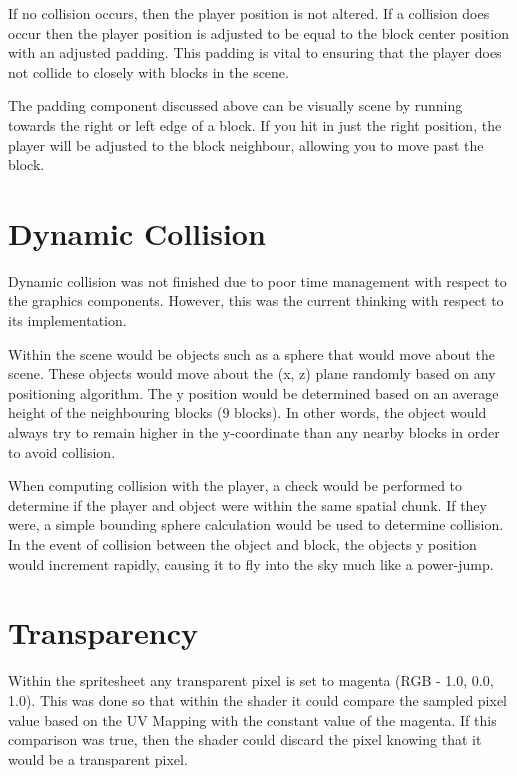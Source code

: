 \documentclass{book}
\begin{document}
If no collision occurs, then the player position is not altered.  If a collision does occur then the player position is adjusted to be equal to the block center position with an adjusted padding.  This padding is vital to ensuring that the player does not collide to closely with blocks in the scene.
    
The padding component discussed above can be visually scene by running towards the right or left edge of a block.  If you hit in just the right position, the player will be adjusted to the block neighbour, allowing you to move past the block.
    
\section{Dynamic Collision}
    
Dynamic collision was not finished due to poor time management with respect to the graphics components.  However, this was the current thinking with respect to its implementation.
    
Within the scene would be objects such as a sphere that would move about the scene.  These objects would move about the (x, z) plane randomly based on any positioning algorithm.  The y position would be determined based on an average height of the neighbouring blocks (9 blocks).  In other words, the object would always try to remain higher in the y-coordinate than any nearby blocks in order to avoid collision.
    
When computing collision with the player, a check would be performed to determine if the player and object were within the same spatial chunk.  If they were, a simple bounding sphere calculation would be used to determine collision.  In the event of collision between the object and block, the objects y position would increment rapidly, causing it to fly into the sky much like a power-jump.  
    
\section{Transparency}
    
Within the spritesheet any transparent pixel is set to magenta (RGB - 1.0, 0.0, 1.0).  This was done so that within the shader it could compare the sampled pixel value based on the UV Mapping with the constant value of the magenta.  If this comparison was true, then the shader could discard the pixel knowing that it would be a transparent pixel.
    
\end{document}
